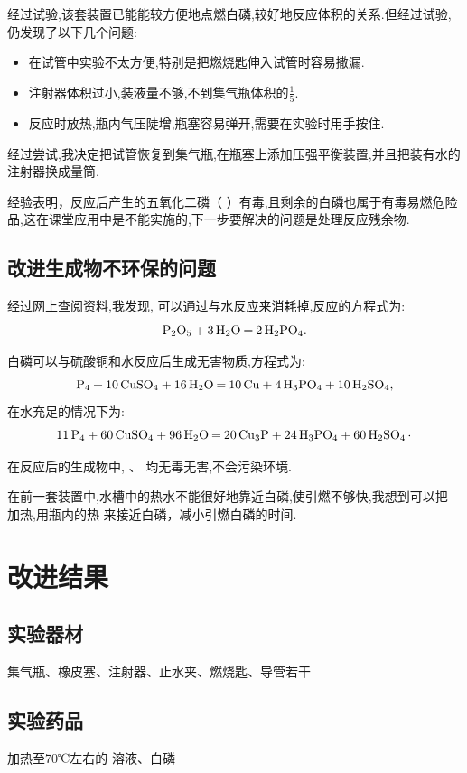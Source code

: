\documentclass[11pt,a4paper,titlepage,twocolumn]{ctexart}
\begin{document}
	经过试验,该套装置已能能较方便地点燃白磷,较好地反应体积的关系.但经过试验,仍发现了以下几个问题:
	
	\begin{itemize}
		\item 在试管中实验不太方便,特别是把燃烧匙伸入试管时容易撒漏.
		\item 注射器体积过小,装液量不够,不到集气瓶体积的$\frac{1}{5}$.
		\item 反应时放热,瓶内气压陡增,瓶塞容易弹开,需要在实验时用手按住. 
	\end{itemize}
	
	经过尝试,我决定把试管恢复到集气瓶,在瓶塞上添加压强平衡装置,并且把装有水的注射器换成量筒.
	
	经验表明，反应后产生的五氧化二磷（ ）有毒,且剩余的白磷也属于有毒易燃危险品,这在课堂应用中是不能实施的,下一步要解决的问题是处理反应残余物.
	
	\subsection{改进生成物不环保的问题}
	
	经过网上查阅资料,我发现, 可以通过与水反应来消耗掉,反应的方程式为:
	\[ \ce{P2O5 + 3H2O = 2H2PO4}.\]
	
	白磷可以与硫酸铜和水反应后生成无害物质,方程式为:
	{\footnotesize \[ \ce{P4 + 10CuSO4 + 16H2O = 10Cu + 4H3PO4 + 10H2SO4},\]}
	在水充足的情况下为:{\scriptsize \[ \ce{11P4 + 60CuSO4 + 96H2O = 20Cu3P + 24H3PO4 + 60H2SO4.}\]}
	
	在反应后的生成物中, 、 均无毒无害,不会污染环境.
	
	在前一套装置中,水槽中的热水不能很好地靠近白磷,使引燃不够快,我想到可以把 加热,用瓶内的热 来接近白磷，减小引燃白磷的时间.
	\section{改进结果}
	\subsection{实验器材}
	
	集气瓶、橡皮塞、注射器、止水夹、燃烧匙、导管若干
	
	\subsection{实验药品}
	
	加热至70℃左右的 溶液、白磷
	
\end{document}
